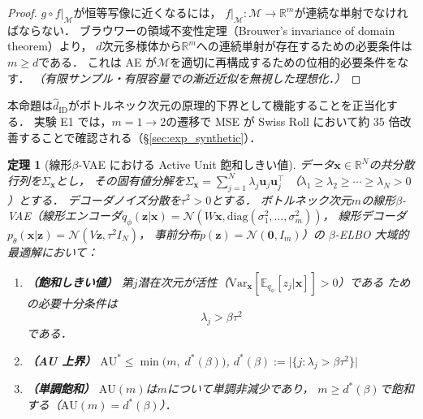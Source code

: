 \documentclass[11pt,a4paper]{jsarticle}
\newtheorem{theorem}{定理}
\newcommand{\R}{\mathbb{R}}
\begin{document}
\begin{proof}
$g \circ f|_\mathcal{M}$が恒等写像に近くなるには，
$f|_\mathcal{M}: \mathcal{M} \to \R^m$が連続な単射でなければならない．
ブラウワーの領域不変性定理（Brouwer's invariance of domain theorem）\cite{hatcher2002algebraic}より，
$d$次元多様体から$\R^m$への連続単射が存在するための必要条件は$m \geq d$である．
これは AE が$\mathcal{M}$を適切に再構成するための位相的必要条件をなす．
\textit{（有限サンプル・有限容量での漸近近似を無視した理想化．）}
\end{proof}

本命題は$\hat{d}_\mathrm{ID}$がボトルネック次元の原理的下界として機能することを正当化する．
実験 E1 では，$m = 1 \to 2$の遷移で MSE が Swiss Roll において約 35 倍改善することで確認される（§\ref{sec:exp_synthetic}）．

\begin{theorem}[線形$\beta$-VAE における Active Unit 飽和しきい値]\label{thm:linear_vae}
データ$\boldsymbol{x} \in \R^N$の共分散行列を$\Sigma_{\boldsymbol{x}}$とし，
その固有値分解を$\Sigma_{\boldsymbol{x}} = \sum_{j=1}^{N} \lambda_j \boldsymbol{u}_j \boldsymbol{u}_j^\top$
（$\lambda_1 \geq \lambda_2 \geq \cdots \geq \lambda_N > 0$）とする．
デコーダノイズ分散を$\tau^2 > 0$とする．
ボトルネック次元$m$の線形$\beta$-VAE（線形エンコーダ$q_\phi(\boldsymbol{z}|\boldsymbol{x}) = \mathcal{N}(W\boldsymbol{x}, \mathrm{diag}(\sigma_1^2,\ldots,\sigma_m^2))$，
線形デコーダ$p_\theta(\boldsymbol{x}|\boldsymbol{z}) = \mathcal{N}(V\boldsymbol{z}, \tau^2 I_N)$，
事前分布$p(\boldsymbol{z}) = \mathcal{N}(\boldsymbol{0}, I_m)$）の
$\beta$-ELBO 大域的最適解において：

\begin{enumerate}
  \item \textbf{（飽和しきい値）} 第$j$潜在次元が活性（$\mathrm{Var}_{\boldsymbol{x}}[\mathbb{E}_{q_\phi}[z_j|\boldsymbol{x}]] > 0$）である
        ための必要十分条件は
        \begin{equation}
          \lambda_j > \beta \tau^2 \label{eq:au_threshold}
        \end{equation}
        である．
  \item \textbf{（AU 上界）}
        $\mathrm{AU}^* \leq \min\bigl(m,\; d^*(\beta)\bigr)$,\quad
        $d^*(\beta) := \bigl|\{j : \lambda_j > \beta\tau^2\}\bigr|$
  \item \textbf{（単調飽和）}
        $\mathrm{AU}(m)$は$m$について単調非減少であり，
        $m \geq d^*(\beta)$で飽和する（$\mathrm{AU}(m) = d^*(\beta)$）．
\end{enumerate}
\end{theorem}
\end{document}
